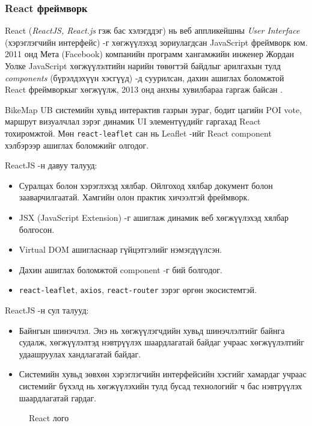 \subsubsection{React фреймворк}
React (\textit{ReactJS, React.js} гэж бас хэлэгддэг) нь веб аппликейшны \textit{User Interface} (хэрэглэгчийн интерфейс) -г хөгжүүлэхэд зориулагдсан JavaScript фреймворк юм. 2011 онд Мета (Facebook) компанийн программ хангамжийн инженер Жордан Уолке JavaScript хөгжүүлэлтийн нарийн төвөгтэй байдлыг арилгахын тулд \textit{components} (бүрэлдэхүүн хэсгүүд) -д суурилсан, дахин ашиглах боломжтой React фреймворкыг хөгжүүлж, 2013 онд анхны хувилбараа гаргаж байсан \cite{react}.

\par BikeMap UB системийн хувьд интерактив газрын зураг, бодит цагийн POI vote, маршрут визуалчлал зэрэг динамик UI элементүүдийг гаргахад React тохиромжтой. Мөн \texttt{react-leaflet} сан нь Leaflet -ийг React component хэлбэрээр ашиглах боломжийг олгодог.

\par ReactJS -н давуу талууд:
\begin{itemize}
    \item Суралцах болон хэрэглэхэд хялбар. Ойлгоход хялбар документ болон зааварчилгаатай. Хамгийн олон практик хичээлтэй фреймворк.
    \item JSX (JavaScript Extension) -г ашиглаж динамик веб хөгжүүлэхэд хялбар болгосон.
    \item Virtual DOM ашигласнаар гүйцэтгэлийг нэмэгдүүлсэн.
    \item Дахин ашиглах боломжтой component -г бий болгодог.
    \item \texttt{react-leaflet}, \texttt{axios}, \texttt{react-router} зэрэг өргөн экосистемтэй.
\end{itemize}

ReactJS -н сул талууд:
\begin{itemize}
    \item Байнгын шинэчлэл. Энэ нь хөгжүүлэгчдийн хувьд шинэчлэлтийг байнга судалж, хөгжүүлэлтэд нэвтрүүлэх шаардлагатай байдаг учраас хөгжүүлэлтийг удаашруулах хандлагатай байдаг.
    \item Системийн хувьд зөвхөн хэрэглэгчийн интерфейсийн хэсгийг хамардаг учраас системийг бүхэлд нь хөгжүүлэхийн тулд бусад технологийг ч бас нэвтрүүлэх шаардлагатай гардаг.
\end{itemize}

\begin{figure}[H]
    \centering
    \caption{React лого}
    \label{fig:react-logo}
\end{figure}

